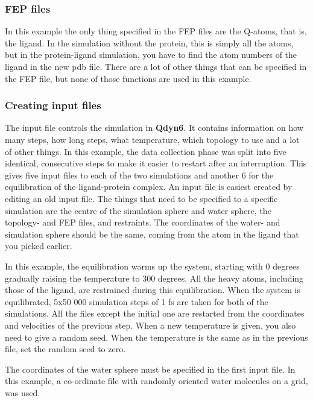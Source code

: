 \documentclass[a4paper,11pt]{article}
\begin{document}
\subsubsection{FEP files}
In this  example the  only thing  specified in the  FEP files  are the
Q-atoms, that is,  the ligand. In the simulation  without the protein,
this is  simply all the  atoms, but in the  protein-ligand simulation,
you  have to  find the  atom  numbers of  the  ligand in  the new  pdb
file. There are a lot of other things that can be specified in the FEP
file, but none of those functions are used in this example.

\subsubsection{Creating input files}
The input file  controls the simulation in  \textbf{Qdyn6}. It contains
information on how many steps, how long steps, what temperature, which
topology to use and  a lot of other things. In  this example, the data
collection phase was  split into five identical,  consecutive steps to
make it easier to restart after an interruption. This gives five input
files  to  each  of  the  two   simulations  and  another  6  for  the
equilibration of the ligand-protein complex.  An input file is easiest
created  by editing  an old  input file.  The things  that need  to be
specified to  a specific simulation  are the centre of  the simulation
sphere  and   water  sphere,   the  topology-   and  FEP   files,  and
restraints. The coordinates of the water- and simulation sphere should
be  the same,  coming from  the  atom in  the ligand  that you  picked
earlier.

In this example, the equilibration  warms up the system, starting with
0 degrees gradually  raising the temperature to 300  degrees.  All the
heavy atoms, including those of the ligand, are restrained during this
equilibration. When  the system  is equilibrated, 5x50  000 simulation
steps of  1 fs are  taken for both of  the simulations. All  the files
except  the  initial  one  are  restarted  from  the  coordinates  and
velocities of the previous step. When  a new temperature is given, you
also need to give a random seed.   When the temperature is the same as
in the previous file, set the random seed to zero.

The coordinates  of the water  sphere must  be specified in  the first
input file. In this example, a co-ordinate file with randomly oriented
water molecules on a grid, was used.
\end{document}
